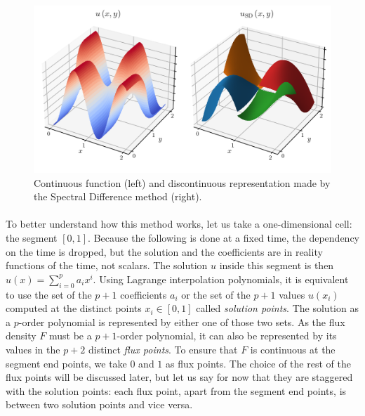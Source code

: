       \begin{figure}
        \centering
        \includegraphics{figures/sd_discontinuous.png}
        \caption{Continuous function (left) and discontinuous representation made by the Spectral Difference method (right).}
        \label{fig:sd_discontinuous}
      \end{figure}

      \pagebreak
      \paragraph{}
      To better understand how this method works, let us take a one-dimensional cell: the segment $\left[0, 1\right]$.
      Because the following is done at a fixed time, the dependency on the time is dropped, but the solution and the coefficients are in reality functions of the time, not scalars.
      The solution $u$ inside this segment is then $u\left(x\right) = \sum_{i=0}^p a_ix^i$.
      Using Lagrange interpolation polynomials, it is equivalent to use the set of the $p + 1$ coefficients $a_i$ or the set of the $p + 1$ values $u\left(x_i\right)$ computed at the distinct points $x_i \in \left[0, 1\right]$ called \emph{solution points}.
      The solution as a $p$-order polynomial is represented by either one of those two sets.
      As the flux density $F$ must be a $p\!+\!1$-order polynomial, it can also be represented by its values in the $p + 2$ distinct \emph{flux points}.
      To ensure that $F$ is continuous at the segment end points, we take $0$ and $1$ as flux points.
      The choice of the rest of the flux points will be discussed later, but let us say for now that they are staggered with the solution points: each flux point, apart from the segment end points, is between two solution points and vice versa.

